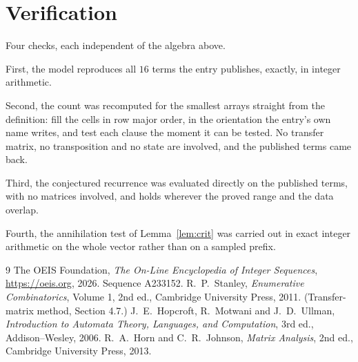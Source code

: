 \documentclass[11pt,a4paper]{article}
\theoremstyle{plain}
\theoremstyle{definition}
\begin{document}
\section{Verification}

Four checks, each independent of the algebra above.

First, the model reproduces all $16$ terms the entry publishes, exactly, in integer
arithmetic.

Second, the count was recomputed for the smallest arrays straight from the definition: fill the
cells in row major order, in the orientation the entry's own name writes, and test each clause
the moment it can be tested. No transfer matrix, no transposition and no state are involved,
and the published terms came back.

Third, the conjectured recurrence was evaluated directly on the published terms, with no
matrices involved, and holds wherever the proved range and the data overlap.

Fourth, the annihilation test of Lemma~\ref{lem:crit} was carried out in exact integer
arithmetic on the whole vector rather than on a sampled prefix.

\begin{thebibliography}{9}
 The OEIS Foundation, \emph{The On-Line Encyclopedia of Integer
Sequences}, \url{https://oeis.org}, 2026. Sequence A233152.
 R.~P.~Stanley, \emph{Enumerative Combinatorics}, Volume 1, 2nd ed.,
Cambridge University Press, 2011. (Transfer-matrix method, Section 4.7.)
 J.~E.~Hopcroft, R.~Motwani and J.~D.~Ullman, \emph{Introduction to Automata
Theory, Languages, and Computation}, 3rd ed., Addison--Wesley, 2006.
 R.~A.~Horn and C.~R.~Johnson, \emph{Matrix Analysis}, 2nd ed., Cambridge
University Press, 2013.
\end{thebibliography}
\end{document}
